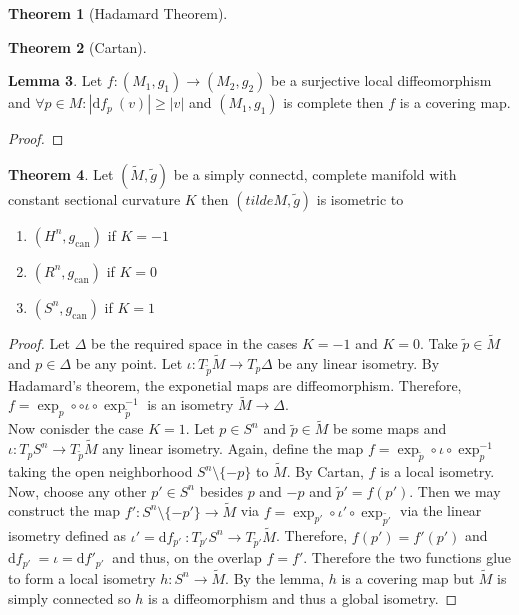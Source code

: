\documentclass[12pt]{extarticle}
\renewcommand{\d}[1]{ \mathrm{d}#1 \:}
\theoremstyle{definition}
\newtheorem{theorem}{Theorem}[section]
\newtheorem{lemma}[theorem]{Lemma}
\begin{document}
\begin{theorem}[Hadamard Theorem]

\end{theorem}

\begin{theorem}[Cartan]

\end{theorem}


\begin{lemma}
Let $f : (M_1, g_1) \to (M_2, g_2)$ be a surjective local diffeomorphism and $\forall p \in M : |\d{f_p}(v)| \ge |v|$ and $(M_1, g_1)$ is complete then $f$ is a covering map. 
\end{lemma}

\begin{proof}

\end{proof}

\begin{theorem}
Let $(\tilde{M}, \tilde{g})$ be a simply connectd, complete manifold with constant sectional curvature $K$ then $(tilde{M}, \tilde{g})$ is isometric to
\begin{enumerate}
\item $(H^n, g_{\text{can}})$ if $K = -1$
\item $(R^n, g_{\text{can}})$ if $K = 0$
\item $(S^n, g_{\text{can}})$ if $K = 1$
\end{enumerate} 
\end{theorem}

\begin{proof}
Let $\Delta$ be the required space in the cases $K = -1$ and $K = 0$. Take $\tilde{p} \in \tilde{M}$ and $p \in \Delta$ be any point. Let $\iota : T_{\tilde{p}} \tilde{M} \to T_p \Delta$ be any linear isometry. By Hadamard's theorem, the exponetial maps are diffeomorphism. Therefore, $f = \exp_p \circ \circ \iota \circ \exp_{\tilde{p}}^{-1}$ is an isometry $\tilde{M} \to \Delta$. 
\bigskip\\
Now conisder the case $K = 1$. Let $p \in S^n$ and $\tilde{p} \in \tilde{M}$ be some maps and $\iota : T_p S^n \to T_{\tilde{p}} \tilde{M}$ any linear isometry. Again, define the map $f = \exp_{\tilde{p}} \circ \iota \circ \exp_p^{-1}$ taking the open neighborhood $S^{n} \setminus \{-p\}$ to $\tilde{M}$. By Cartan, $f$ is a local isometry. Now, choose any other $p' \in S^n$ besides $p$ and $-p$ and $\tilde{p}' = f(p')$. Then we may construct the map $f' : S^n \setminus \{ - p' \} \to \tilde{M}$ via $f = \exp_{p'} \circ \iota' \circ \exp_{\tilde{p'}}$ via the linear isometry defined as $\iota' = \d{f_{p'}} : T_{p'} S^n \to T_{\tilde{p}'} \tilde{M}$. Therefore, $f(p') = f'(p')$ and $\d{f_{p'}} = \iota = \d{f'_{p'}}$ and thus, on the overlap $f = f'$. Therefore the two functions glue to form a local isometry $h : S^n \to \tilde{M}$. By the lemma, $h$ is a covering map but $\tilde{M}$ is simply connected so $h$ is a diffeomorphism and thus a global isometry.     
\end{proof}
\end{document}
